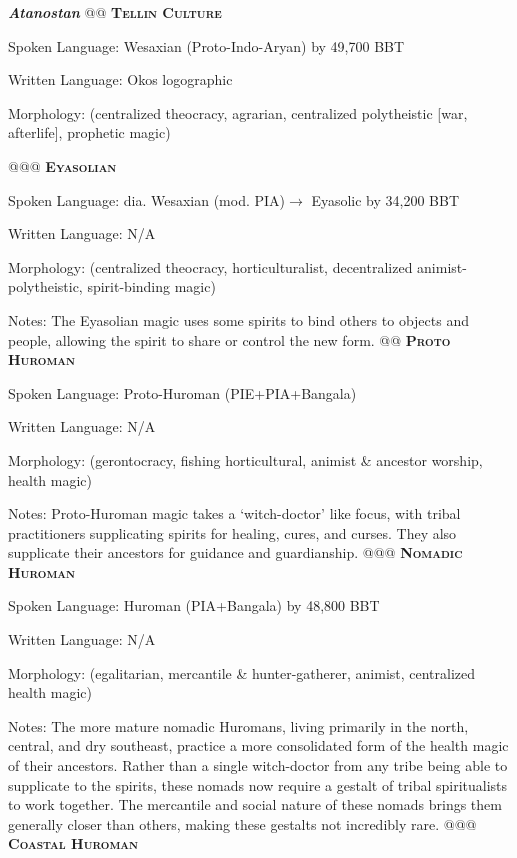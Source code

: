 \documentclass[12pt]{article}
\begin{document}
\begin{easylist}
	
	\indent \textbf{\textit{Atanostan}}
	@@ \textsc{\textbf{Tellin Culture}}
	
	\normalfont Spoken Language: Wesaxian (Proto-Indo-Aryan) by 49,700 BBT
	
	Written Language: Okos logographic
	
	Morphology: (centralized theocracy, agrarian, centralized polytheistic [war, afterlife], prophetic magic)
	
	@@@ \textsc{\textbf{Eyasolian}}
	
	\normalfont Spoken Language: dia. Wesaxian (mod. PIA)$\rightarrow$ Eyasolic by 34,200 BBT 
	
	Written Language: N/A
	
	Morphology: (centralized theocracy, horticulturalist, decentralized animist-polytheistic, spirit-binding magic)
	
	{\footnotesize Notes: The Eyasolian magic uses some spirits to bind others to objects and people, allowing the spirit to share or control the new form.}
	@@ \textsc{\textbf{Proto Huroman}}

	\normalfont Spoken Language: Proto-Huroman (PIE+PIA+Bangala)
	
	Written Language: N/A
	
	Morphology: (gerontocracy, fishing horticultural, animist \& ancestor worship, health magic)
	
	{\footnotesize Notes: Proto-Huroman magic takes a `witch-doctor' like focus, with tribal practitioners supplicating spirits for healing, cures, and curses. They also supplicate their ancestors for guidance and guardianship.}
	@@@ \textsc{\textbf{Nomadic Huroman}}
	
	\normalfont Spoken Language: Huroman (PIA+Bangala) by 48,800 BBT
	
	Written Language: N/A
	
	Morphology: (egalitarian, mercantile \& hunter-gatherer, animist, centralized health magic)
	
	{\footnotesize Notes: The more mature nomadic Huromans, living primarily in the north, central, and dry southeast, practice a more consolidated form of the health magic of their ancestors. Rather than a single witch-doctor from any tribe being able to supplicate to the spirits, these nomads now require a gestalt of tribal spiritualists to work together. The mercantile and social nature of these nomads brings them generally closer than others, making these gestalts not incredibly rare.}
	@@@ \textsc{\textbf{Coastal Huroman}}
	

\end{easylist}
\end{document}
